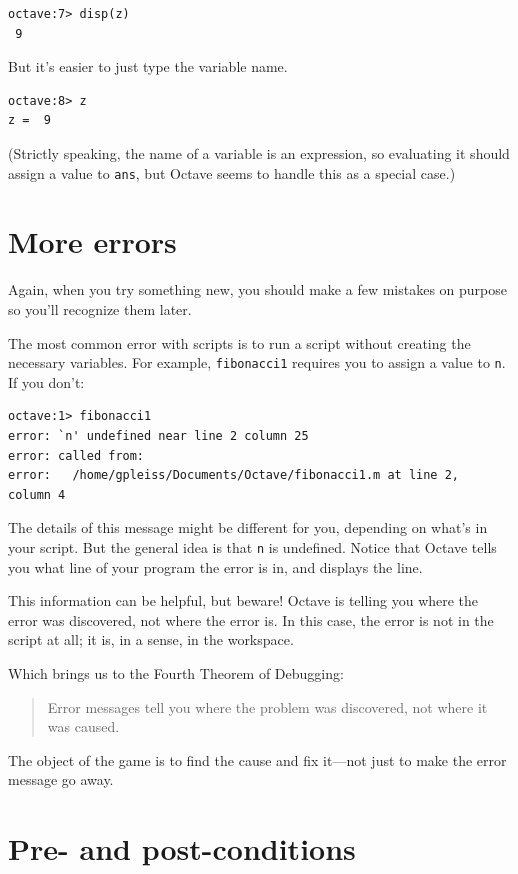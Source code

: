 \documentclass{book}
\begin{document}
\begin{verbatim}
octave:7> disp(z)
 9
\end{verbatim}

But it's easier to just type the variable name.

\begin{verbatim}
octave:8> z
z =  9
\end{verbatim}

(Strictly speaking, the name of a variable is an expression, so
evaluating it should assign a value to {\tt ans}, but Octave seems
to handle this as a special case.)


\section{More errors}

Again, when you try something new, you should make a few mistakes
on purpose so you'll recognize them later.

The most common error with scripts is to run a script without creating
the necessary variables. For example, {\tt fibonacci1} requires you
to assign a value to {\tt n}. If you don't:

\begin{verbatim}
octave:1> fibonacci1
error: `n' undefined near line 2 column 25
error: called from:
error:   /home/gpleiss/Documents/Octave/fibonacci1.m at line 2, 
column 4
\end{verbatim}
 
The details of this message might be different for you, depending
on what's in your script. But the general idea is that {\tt n}
is undefined. Notice that Octave tells you what line of your
program the error is in, and displays the line.

This information can be helpful, but beware! Octave is telling you
where the error was discovered, not where the error is. In this
case, the error is not in the script at all; it is, in a sense, in
the workspace.

Which brings us to the Fourth Theorem of Debugging:

\begin{quote}
Error messages tell you where the problem was discovered, not
where it was caused. 
\end{quote}

The object of the game is to find the cause and
fix it---not just to make the error message go away.


\section{Pre- and post-conditions}
\end{document}
